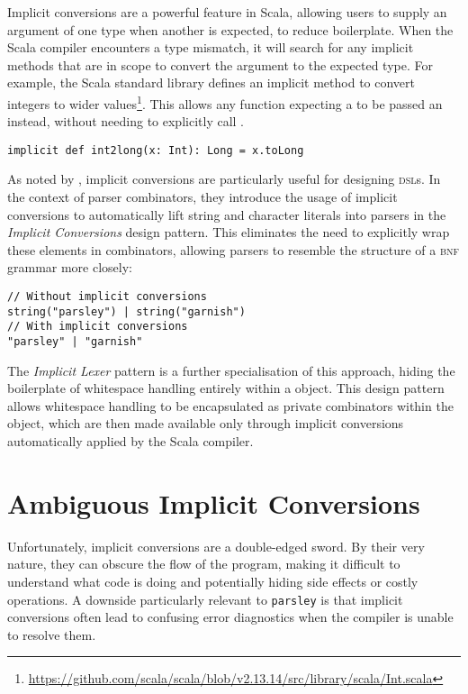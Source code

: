 \documentclass[../../main.tex]{subfiles}
\begin{document}

\label{sec:simple-rules}
Implicit conversions are a powerful feature in Scala, allowing users to supply an argument of one type when another is expected, to reduce boilerplate.
When the Scala compiler encounters a type mismatch, it will search for any implicit methods that are in scope to convert the argument to the expected type.
For example, the Scala standard library defines an implicit method to convert integers to wider  values\footnote{\url{https://github.com/scala/scala/blob/v2.13.14/src/library/scala/Int.scala}}.
This allows any function expecting a  to be passed an  instead, without needing to explicitly call .
\begin{verbatim}
implicit def int2long(x: Int): Long = x.toLong
\end{verbatim}
%
As noted by \textcite{willis_design_2022}, implicit conversions are particularly useful for designing \textsc{dsl}s.
In the context of parser combinators, they introduce the usage of implicit conversions to automatically lift string and character literals into parsers in the \emph{Implicit Conversions} design pattern.
This eliminates the need to explicitly wrap these elements in combinators, allowing parsers to resemble the structure of a \textsc{bnf} grammar more closely:
\begin{verbatim}
// Without implicit conversions
string("parsley") | string("garnish")
// With implicit conversions
"parsley" | "garnish"
\end{verbatim}
%
The \emph{Implicit Lexer} pattern is a further specialisation of this approach, hiding the boilerplate of whitespace handling entirely within a  object.
This design pattern allows whitespace handling to be encapsulated as private combinators within the  object, which are then made available only through implicit conversions automatically applied by the Scala compiler.

\section{Ambiguous Implicit Conversions}\label{sec:ambiguous-implicits}
Unfortunately, implicit conversions are a double-edged sword.
By their very nature, they can obscure the flow of the program, making it difficult to understand what code is doing and potentially hiding side effects or costly operations.
A downside particularly relevant to \texttt{parsley} is that implicit conversions often lead to confusing error diagnostics when the compiler is unable to resolve them.
\end{document}
